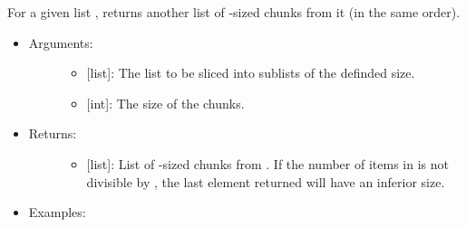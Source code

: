 \documentclass[letterpaper,10pt,english]{sphinxmanual}
\begin{document}

\begin{fulllineitems}
\label{\detokenize{iterables:data_tools.iterables.chunk_this}}
For a given list , returns another list of -sized chunks from
it (in the same order).
\begin{itemize}
\item {} \begin{description}
\item[{Arguments:}] \leavevmode\begin{itemize}
\item {} 
 {[}list{]}: The list to be sliced into sublists of the
definded size.

\item {} 
 {[}int{]}: The size of the chunks.

\end{itemize}

\end{description}

\item {} \begin{description}
\item[{Returns:}] \leavevmode\begin{itemize}
\item {} 
{[}list{]}: List of -sized chunks from .  If the
number of items in  is not divisible by , the last
element returned will have an inferior size.

\end{itemize}

\end{description}

\item {} \begin{description}
\item[{Examples:}] \leavevmode
\begin{sphinxVerbatim}[commandchars=\\\{\}]
  
 
 
\end{sphinxVerbatim}

\end{description}

\end{itemize}

\end{fulllineitems}
\end{document}
